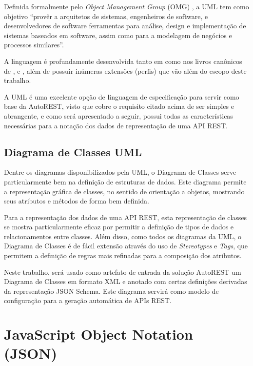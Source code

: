 Definida formalmente pelo \textit{Object Management Group} (OMG) \cite{OMG:2011}, a UML tem como objetivo ``provêr a arquitetos de sistemas, engenheiros de software, e desenvolvedores de software ferramentas para análise, design e implementação de sistemas baseados em software, assim como para a modelagem de negócios e processos similares''.

A linguagem é profundamente desenvolvida tanto em \cite{OMG:2011} como nos livros canônicos de ,  e , além de possuir inúmeras extensões (perfis) que vão além do escopo deste trabalho.

A UML é uma excelente opção de linguagem de especificação para servir como base da AutoREST, visto que cobre o requisito citado acima de ser simples e abrangente, e como será apresentado a seguir, possui todas as características necessárias para a notação dos dados de representação de uma API REST.


\subsection{Diagrama de Classes UML}

Dentre os diagramas disponibilizados pela UML, o Diagrama de Classes serve particularmente bem na definição de estruturas de dados. Este diagrama permite a representação gráfica de classes, no sentido de orientação a objetos, mostrando seus atributos e métodos de forma bem definida.

Para a representação dos dados de uma API REST, esta representação de classes se mostra particularmente eficaz por permitir a definição de tipos de dados e relacionamentos entre classes. Além disso, como todos os diagramas da UML, o Diagrama de Classes é de fácil extensão através do uso de \textit{Stereotypes} e \textit{Tags}, que permitem a definição de regras mais refinadas para a composição dos atributos.

Neste trabalho, será usado como artefato de entrada da solução AutoREST um Diagrama de Classes em formato XML e anotado com certas definições derivadas da representação JSON Schema. Este diagrama servirá como modelo de configuração para a geração automática de APIs REST.


\section{JavaScript Object Notation (JSON)}

